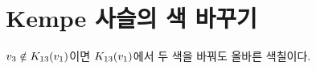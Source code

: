 \section{Kempe 사슬의 색 바꾸기}\label{app:kempe}
$v_3\notin K_{13}(v_1)$이면 $K_{13}(v_1)$에서 두 색을 바꿔도 올바른 색칠이다.
